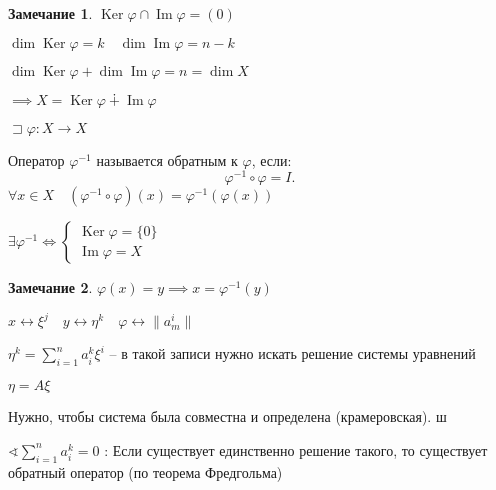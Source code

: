 \documentclass{book}
\DeclareMathOperator{\Image}{Im}
\DeclareMathOperator{\Ker}{Ker}
\theoremstyle{definition}
\newtheorem*{note}{Замечание}
\begin{document}
    \begin{note}
        $\Ker \varphi\cap \Image \varphi = \left( 0 \right) $

        $\dim \Ker\varphi = k\quad \dim \Image \varphi = n-k $

         $\dim \Ker \varphi + \dim \Image \varphi = n = \dim X$

         $\implies X = \Ker\varphi \dotplus \Image \varphi$
    \end{note}

$\sqsupset \varphi: X\to X$

\begin{definition}
    Оператор $\varphi^{-1}$ называется обратным к  $\varphi$, если:
    \[
        \varphi^{-1}\circ\varphi = I
    .\] 
    $\forall x\in X\quad \left( \varphi^{-1}\circ \varphi \right) (x) = \varphi^{-1}\left( \varphi(x) \right) $
\end{definition}

\begin{theorem}
    $\exists \varphi^{-1} \iff \begin{cases}
        \Ker\varphi = \{0\}\\
        \Image \varphi = X
    \end{cases}$
\end{theorem}
\begin{note}
    $\varphi(x) = y \implies x = \varphi^{-1}(y)$ 
    
    $x \longleftrightarrow \xi^j\quad y\longleftrightarrow \eta^k\quad \varphi \longleftrightarrow \|a^i_m\|$

     $\eta^k = \sum_{i=1}^{n} a_i^k\xi^i$ -- в такой записи нужно искать решение системы уравнений

     $\eta = A\xi$ 

     Нужно, чтобы система была совместна и определена (крамеровская). ш

     $\sphericalangle \sum_{i=1}^{n} a^k_i = 0$ : Если существует единственно решение такого, то существует обратный оператор (по теорема Фредгольма)
\end{note}
\end{document}
